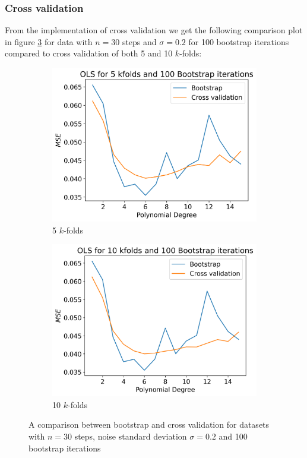 \documentclass[12pt]{article}
\begin{document}
\subsubsection{Cross validation}
From the implementation of cross validation we get the following comparison plot in figure \ref{fig:cv_comp} for data with $n=30$ steps and $\sigma=0.2$ for 100 bootstrap iterations compared to cross validation of both 5 and 10 $k$-folds:
\begin{figure}[H]
  \begin{subfigure}{.5\textwidth}
    \centering
    \includegraphics[width=\textwidth]{../figures/boot_cv_comp_OLS_100_5.png}
    \caption{5 $k$-folds}
    \label{fig:cv_b_comp_5}
  \end{subfigure}
  \begin{subfigure}{.5\textwidth}
    \centering
    \includegraphics[width=\textwidth]{../figures/boot_cv_comp_OLS_100_10.png}
    \caption{10 $k$-folds}
    \label{fig:cv_b_comp_10}
  \end{subfigure}
  \caption{A comparison between bootstrap and cross validation for datasets with $n=30$ steps, noise standard deviation $\sigma=0.2$ and 100 bootstrap iterations}
  \label{fig:cv_comp}
\end{figure}
\end{document}
